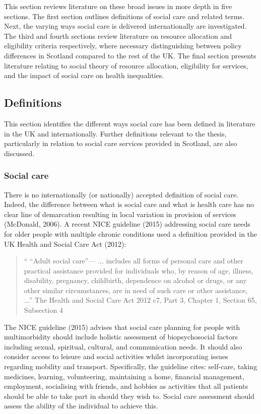 \documentclass[12pt,a4paper,oneside,table]{report}
\begin{document}
This section reviews literature on these broad issues in more depth in
five sections. The first section outlines definitions of social care and
related terms. Next, the varying ways social care is delivered
internationally are investigated. The third and fourth sections review
literature on resource allocation and eligibility criteria respectively,
where necessary distinguishing between policy differences in Scotland
compared to the rest of the UK. The final section presents literature
relating to social theory of resource allocation, eligibility for
services, and the impact of social care on health inequalities.

\subsection{Definitions}\label{subsec:access-sc-defs}

This section identifies the different ways social care has been defined
in literature in the UK and internationally. Further definitions
relevant to the thesis, particularly in relation to social care services
provided in Scotland, are also discussed.

\subsubsection{Social care}\label{subsubsec:sc-def}

There is no internationally (or nationally) accepted definition of
social care. Indeed, the difference between what is social care and what
is health care has no clear line of demarcation resulting in local
variation in provision of services (McDonald, 2006). A recent NICE
guideline (2015) addressing social care needs for older people with
multiple chronic conditions used a definition provided in the UK Health
and Social Care Act (2012):

\begin{quotation}
    `` ``Adult social care”—
    ... includes all forms of personal care and other practical assistance provided for individuals who, by reason of age, illness, disability, pregnancy, childbirth, dependence on alcohol or drugs, or any other similar circumstances, are in need of such care or other assistance, ...” \hfill{The Health and Social Care Act  2012 c7, Part 3, Chapter 1, Section 65, Subsection 4}\end{quotation}

The NICE guideline (2015) advises that social care planning for people
with multimorbidity should include holistic assessment of
biopsychosocial factors including sexual, spiritual, cultural, and
communication needs. It should also consider access to leisure and
social activities whilst incorporating issues regarding mobility and
transport. Specifically, the guideline cites: self-care, taking
medicines, learning, volunteering, maintaining a home, financial
management, employment, socialising with friends, and hobbies as
activities that all patients should be able to take part in should they
wish to. Social care assessment should assess the ability of the
individual to achieve this.
\end{document}
